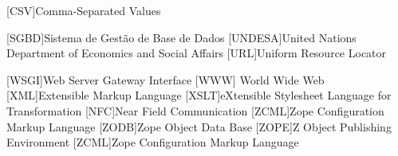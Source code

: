\begin{acronym}[RELAX NG]
		[CSV]{Comma-Separated Values}
				
		{Sistema de Gestão de Base de Dados}
		[UNDESA]{United Nations Department of Economics and Social Affairs}
		[URL]{Uniform Resource Locator}
		
		{Web Server Gateway Interface}
		[WWW]{ World Wide Web}
		[XML]{Extensible Markup Language}
		{eXtensible Stylesheet Language for Transformation}
		[NFC]{Near Field Communication}
		{Zope Configuration Markup Language}
		{Zope Object Data Base}
		{Z Object Publishing Environment}
		{Zope Configuration Markup Language}
	\end{acronym}
